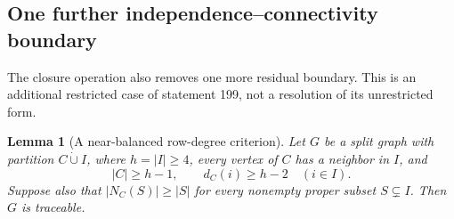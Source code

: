 \documentclass[11pt,a4paper]{article}
\newtheorem{lemma}[theorem]{Lemma}
\theoremstyle{definition}\newtheorem{definition}[theorem]{Definition}
\theoremstyle{remark}\newtheorem{remark}[theorem]{Remark}
\begin{document}
\subsection{One further independence--connectivity boundary}
\label{r12:199:gap-two}
The closure operation also removes one more residual boundary. This is
an additional restricted case of statement 199, not a resolution of
its unrestricted form.

\begin{lemma}[A near-balanced row-degree criterion]
\label{r12:199:row-degree}
Let $G$ be a split graph with partition $C\mathbin{\dot\cup}I$,
where $h=|I|\ge4$, every vertex of $C$ has a neighbor in $I$, and
\[
 |C|\ge h-1,\qquad d_C(i)\ge h-2\quad(i\in I).
\]
Suppose also that $|N_C(S)|\ge |S|$ for every nonempty proper
subset $S\subsetneq I$. Then $G$ is traceable.
\end{lemma}
\end{document}
